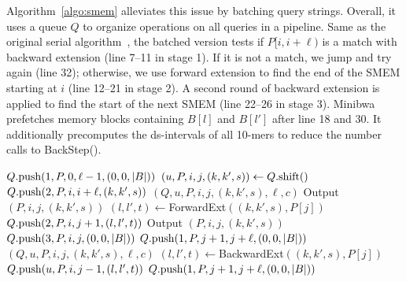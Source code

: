 \documentclass[webpdf,contemporary,large,namedate]{oup-authoring-template}%
\begin{document}
Algorithm~\ref{algo:smem} alleviates this issue by batching query strings.
Overall, it uses a queue $Q$ to organize operations on all queries in a pipeline.
Same as the original serial algorithm~\citep{Li:2024ac},
the batched version tests if $P[i,i+\ell)$ is a match with backward extension (line 7--11 in stage 1).
If it is not a match, we jump and try again (line 32);
otherwise, we use forward extension to find the end of the SMEM starting at $i$ (line 12--21 in stage 2).
A second round of backward extension is applied to find the start of the next SMEM (line 22--26 in stage 3).
Minibwa prefetches memory blocks containing $B[l]$ and $B[l']$ after line 18 and 30.
It additionally precomputes the ds-intervals of all 10-mers to reduce the number calls to {\sc BackStep}().

\begin{algorithm}[tb]
	\caption{Find $(\ell,c)$-SMEMs in string set $\mathcal{P}$}\label{algo:smem}
	\begin{algorithmic}[1]
					\State $Q.{\rm push}(1,P,0,\ell-1,(0,0,|B|))$
				\EndIf
			\EndFor
				\State $(u,P,i,j,(k,k',s))\gets Q.{\rm shift}()$
						\State $Q.{\rm push}(2,P,i,i+\ell,(k,k',s))$
					\Else
						$(Q,u,P,i,j,(k,k',s),\ell,c)$
					\EndIf
						\State Output $(P,i,j,(k,k',s))$
					\EndIf
					\State $(l,l',t)\gets${\sc ForwardExt}$((k,k',s),P[j])$
						\State $Q.{\rm push}(2,P,i,j+1,(l,l',t))$
					\Else{}
						\State Output $(P,i,j,(k,k',s))$
						\State $Q.{\rm push}(3,P,i,j,(0,0,|B|))$
					\EndIf
						\State $Q.{\rm push}(1,P,j+1,j+\ell,(0,0,|B|))$
					\Else
						$(Q,u,P,i,j,(k,k',s),\ell,c)$
					\EndIf
				\EndIf
			\EndWhile
		\EndFunction
			\State $(l,l',t)\gets${\sc BackwardExt}$((k,k',s),P[j])$
				\State $Q.{\rm push}(u,P,i,j-1,(l,l',t))$
				\State $Q.{\rm push}(1,P,j+1,j+\ell,(0,0,|B|))$
			\EndIf
		\EndFunction
	\end{algorithmic}
\end{algorithm}
\end{document}
